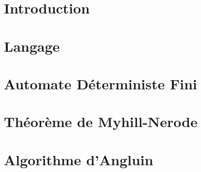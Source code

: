 

\newcommand{\student}{Benjamin André}
\newcommand{\grade}{MAB2 Sciences Informatiques}
\newcommand{\director}{Véronique Bruyère}
\renewcommand{\title}{Automates}
\renewcommand{\date}{\today}


	
		
	
	\tableofcontents
	\newpage
	
	\section{Introduction}\label{sec:intro}
	\section{Langage}\label{sec:langage}
	\section{Automate Déterministe Fini}\label{sec:adf}
	\section{Théorème de Myhill-Nerode}\label{sec:m_n}
	\section{Algorithme d'Angluin}\label{sec:angluin}
	
	\newpage
	
	
	
